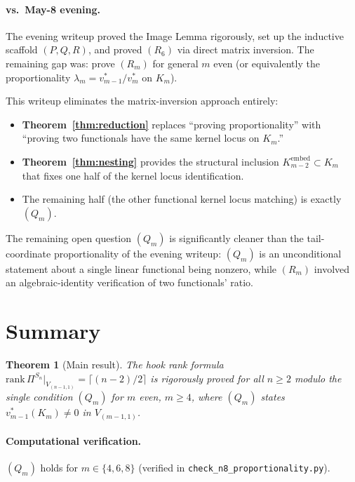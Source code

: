 \documentclass[11pt]{article}
\newtheorem{theorem}{Theorem}
\theoremstyle{definition}
\begin{document}
\paragraph{vs.\ May-8 evening.}
The evening writeup proved the Image Lemma rigorously, set up the
inductive scaffold $(P, Q, R)$, and proved $(R_6)$ via direct matrix
inversion. The remaining gap was: prove $(R_m)$ for general $m$ even
(or equivalently the proportionality $\lambda_m = v_{m-1}^*/v_m^*$
on $K_m$).

This writeup eliminates the matrix-inversion approach entirely:
\begin{itemize}[topsep=0.3em,itemsep=0.2em,leftmargin=2em]
\item \textbf{Theorem~\ref{thm:reduction}} replaces ``proving
  proportionality'' with ``proving two functionals have the same
  kernel locus on $K_m$.''
\item \textbf{Theorem~\ref{thm:nesting}} provides the structural
  inclusion $K_{m-2}^{\mathrm{embed}} \subset K_m$ that fixes one
  half of the kernel locus identification.
\item The remaining half (the other functional kernel locus
  matching) is exactly $(Q_m)$.
\end{itemize}

The remaining open question $(Q_m)$ is significantly cleaner than the
tail-coordinate proportionality of the evening writeup: $(Q_m)$ is
an unconditional statement about a single linear functional being
nonzero, while $(R_m)$ involved an algebraic-identity verification
of two functionals' ratio.

\section{Summary}

\begin{theorem}[Main result]
The hook rank formula
$\mathrm{rank}\,\Pi^{S_n}|_{V_{(n-1,1)}} = \lceil(n-2)/2\rceil$
is rigorously proved for all $n \ge 2$ modulo the single condition
$(Q_m)$ for $m$ even, $m \ge 4$, where $(Q_m)$ states
$v_{m-1}^*(K_m) \neq 0$ in $V_{(m-1,1)}$.
\end{theorem}

\paragraph{Computational verification.}
$(Q_m)$ holds for $m \in \{4, 6, 8\}$ (verified in
\texttt{check\_n8\_proportionality.py}).
\end{document}
